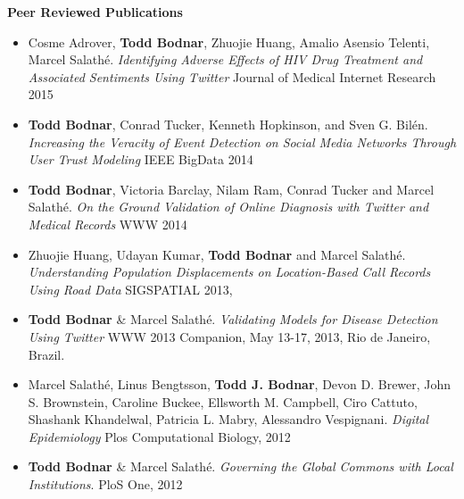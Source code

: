 \textbf{Peer Reviewed Publications}
\begin{itemize}%
\setlength\itemsep{0em}
\item Cosme Adrover, \textbf{Todd Bodnar}, Zhuojie Huang, Amalio Asensio Telenti, Marcel Salath\'e. \textit{Identifying Adverse Effects of HIV Drug Treatment and Associated Sentiments Using Twitter} Journal of Medical Internet Research 2015 %

\item \textbf{Todd Bodnar}, Conrad Tucker, Kenneth Hopkinson, and Sven G. Bil\'en. \textit{Increasing the Veracity of Event Detection on Social Media Networks Through User Trust Modeling} IEEE BigData 2014 %

\item \textbf{Todd Bodnar}, Victoria Barclay, Nilam Ram, Conrad Tucker and Marcel Salath\'e. \textit{On the Ground Validation of Online Diagnosis with Twitter and Medical Records} WWW 2014 %

\item Zhuojie Huang, Udayan Kumar, \textbf{Todd Bodnar} and Marcel Salath\'e. \textit{Understanding Population Displacements on Location-Based Call Records Using Road Data} SIGSPATIAL 2013, %

\item \textbf{Todd Bodnar} \& Marcel Salath\'e. \textit{Validating Models for Disease Detection Using Twitter}  WWW 2013 Companion, May 13-17, 2013, Rio de Janeiro, Brazil. %

\item Marcel Salath\'e, Linus Bengtsson, \textbf{Todd J. Bodnar}, Devon D. Brewer, John S. Brownstein, Caroline Buckee, Ellsworth M. Campbell, Ciro Cattuto, Shashank Khandelwal, Patricia L. Mabry,  Alessandro Vespignani. \textit{Digital Epidemiology} Plos Computational Biology, 2012 %

\item \textbf{Todd Bodnar} \& Marcel Salath\'e. \textit{Governing the Global Commons with Local Institutions}. PloS One, 2012%
\end{itemize}